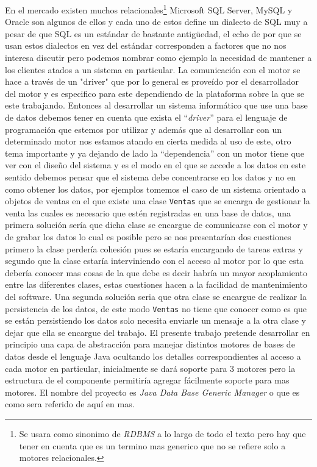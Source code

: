 En el mercado existen muchos \dd relacionales\footnote{Se usara \dd como sinonimo de \textit{RDBMS} a lo largo de todo el texto pero hay que tener en cuenta que \dd es un termino mas generico que no se refiere solo a motores relacionales.} Microsoft SQL Server, MySQL y Oracle son algunos de ellos y cada uno de estos define un dialecto de SQL muy a pesar de que SQL es un estándar de bastante antigüedad, el echo de por que se usan estos dialectos en vez del estándar corresponden a factores que no nos interesa discutir pero podemos nombrar como ejemplo la necesidad de mantener a los clientes atados a un sistema en particular. La comunicación con el motor se hace a través de un "driver" que por lo general es proveído por el desarrollador del motor y es especifico para este dependiendo de la plataforma sobre la que se este trabajando. Entonces al desarrollar un sistema informático que use una base de datos debemos tener en cuenta que exista el ``\textit{driver}'' para el lenguaje de programación que estemos por utilizar y además que al desarrollar con un determinado motor nos estamos atando en cierta medida al uso de este, otro tema importante y ya dejando de lado la ``dependencia'' con un motor tiene que ver con el diseño del sistema y es el modo en el que se accede a los datos en este sentido debemos pensar que el sistema debe concentrarse en los datos y no en como obtener los datos, por ejemplos tomemos el caso de un sistema orientado a objetos de ventas en el que existe una clase \verb=Ventas= que se encarga de gestionar la venta las cuales es necesario que estén registradas en una base de datos, una primera solución sería que dicha clase se encargue de comunicarse con el motor y de grabar los datos lo cual es posible pero se nos presentarían dos cuestiones primero la clase perdería cohesión pues se estaría encargando de tareas extras y segundo que la clase estaría interviniendo con el acceso al motor por lo que esta debería conocer mas cosas de la que debe es decir habría un mayor acoplamiento entre las diferentes clases, estas cuestiones hacen a la facilidad de mantenimiento del software. Una segunda solución seria que otra clase se encargue de realizar la persistencia de los datos, de este modo \verb=Ventas= no tiene que conocer como es que se están persistiendo los datos solo necesita enviarle un mensaje a la otra clase y dejar que ella se encargue del trabajo. El presente trabajo pretende desarrollar en principio una capa de abstracción para manejar distintos motores de bases de datos desde el lenguaje Java ocultando los detalles correspondientes al acceso a cada motor en particular, inicialmente se dará soporte para 3 motores pero  la estructura de el componente permitiría agregar fácilmente soporte para mas motores. El nombre del proyecto es \textit{Java Data Base Generic Manager} o \jj que es como sera referido de aquí en mas.
%
%
